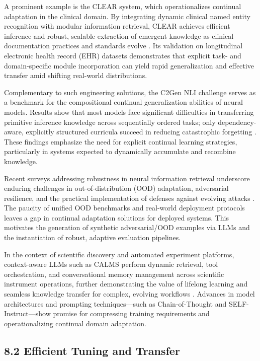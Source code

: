 \documentclass[11pt]{article}
\begin{document}
A prominent example is the CLEAR system, which operationalizes continual adaptation in the clinical domain. By integrating dynamic clinical named entity recognition with modular information retrieval, CLEAR achieves efficient inference and robust, scalable extraction of emergent knowledge as clinical documentation practices and standards evolve \cite{ref7}. Its validation on longitudinal electronic health record (EHR) datasets demonstrates that explicit task- and domain-specific module incorporation can yield rapid generalization and effective transfer amid shifting real-world distributions.

Complementary to such engineering solutions, the C2Gen NLI challenge serves as a benchmark for the compositional continual generalization abilities of neural models. Results show that most models face significant difficulties in transferring primitive inference knowledge across sequentially ordered tasks; only dependency-aware, explicitly structured curricula succeed in reducing catastrophic forgetting \cite{ref46}. These findings emphasize the need for explicit continual learning strategies, particularly in systems expected to dynamically accumulate and recombine knowledge.

Recent surveys addressing robustness in neural information retrieval underscore enduring challenges in out-of-distribution (OOD) adaptation, adversarial resilience, and the practical implementation of defenses against evolving attacks \cite{ref54}. The paucity of unified OOD benchmarks and real-world deployment protocols leaves a gap in continual adaptation solutions for deployed systems. This motivates the generation of synthetic adversarial/OOD examples via LLMs and the instantiation of robust, adaptive evaluation pipelines.

In the context of scientific discovery and automated experiment platforms, context-aware LLMs such as CALMS perform dynamic retrieval, tool orchestration, and conversational memory management across scientific instrument operations, further demonstrating the value of lifelong learning and seamless knowledge transfer for complex, evolving workflows \cite{ref61}. Advances in model architectures and prompting techniques—such as Chain-of-Thought and SELF-Instruct—show promise for compressing training requirements and operationalizing continual domain adaptation.

\subsection{8.2 Efficient Tuning and Transfer}
\end{document}
